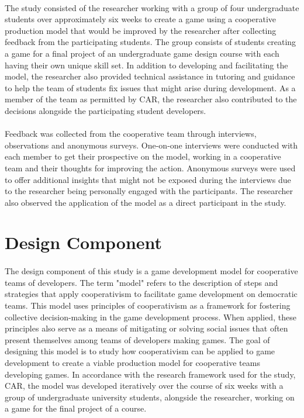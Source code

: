 \paragraph{} The study consisted of the researcher working with a group of four undergraduate students over approximately six weeks to create a game using a cooperative production model that would be improved by the researcher after collecting feedback from the participating students. The group consists of students creating a game for a final project of an undergraduate game design course with each having their own unique skill set. In addition to developing and facilitating the model, the researcher also provided technical assistance in tutoring and guidance to help the team of students fix issues that might arise during development. As a member of the team as permitted by CAR, the researcher also contributed to the decisions alongside the participating student developers.

\paragraph{} Feedback was collected from the cooperative team through interviews, observations and anonymous surveys. One-on-one interviews were conducted with each member to get their prospective on the model, working in a cooperative team and their thoughts for improving the action. Anonymous surveys were used to offer additional insights that might not be exposed during the interviews due to the researcher being personally engaged with the participants. The researcher also observed the application of the model as a direct participant in the study.

\section{Design Component}

\paragraph{} The design component of this study is a game development model for cooperative teams of developers. The term "model" refers to the description of steps and strategies that apply cooperativism to facilitate game development on democratic teams. This model uses principles of cooperativism as a framework for fostering collective decision-making in the game development process. When applied, these principles also serve as a means of mitigating or solving social issues that often present themselves among teams of developers making games. The goal of designing this model is to study how cooperativism can be applied to game development to create a viable production model for cooperative teams developing games. In accordance with the research framework used for the study, CAR, the model was developed iteratively over the course of six weeks with a group of undergraduate university students, alongside the researcher, working on a game for the final project of a course.

